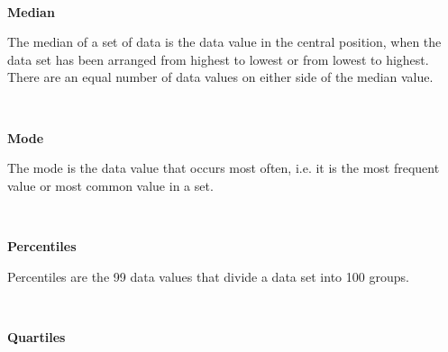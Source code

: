 \begin{description}
\begin{description}
{    }%
          \\\end{description}
	    \item[] \noindent\raggedright {\bf  Median }\\\begin{description}\item{\hspace{.3cm}}\hspace{.3cm}
          \label{m39400*id211687}The median of a set of data is the data value in the central position, when the data set has been arranged from highest to lowest or from lowest to highest. There are an equal number of data values on either side of the median value. \par 
          \\\end{description}
	    \item[] \noindent\raggedright {\bf  Mode }\\\begin{description}\item{\hspace{.3cm}}\hspace{.3cm}
          \label{m39400*id212182}The mode is the data value that occurs most often, i.e. it is the most frequent value or most common value in a set. \par 
          \\\end{description}
	    \vspace{.3cm}
	    \item[{\large \bfseries P}]\noindent\raggedright
	    {\bf  Percentiles }\\\begin{description}\item{\hspace{.3cm}}\hspace{.3cm}
          \label{m39400*id214611}Percentiles are the 99 data values that divide a data set into 100 groups. \par 
          \\\end{description}
	    \vspace{.3cm}
	    \item[{\large \bfseries Q}]\noindent\raggedright
	    {\bf  Quartiles }\\\begin{description}\item{\hspace{.3cm}}\hspace{.3cm}

\end{description}
\end{description}
